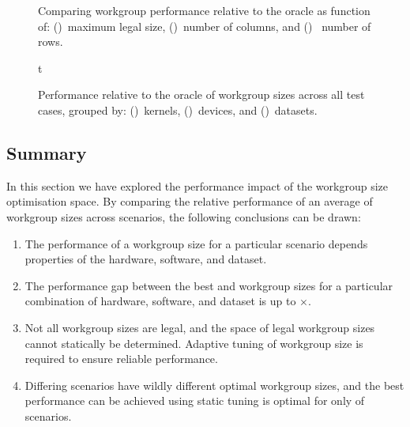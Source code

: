 \begin{figure}

\caption{%
  Comparing workgroup performance relative to the oracle as function
  of: ()~maximum legal size,
  ()~number of columns, and
  ()~ number of rows.%
}
\label{fig:performance-wgsizes}
\end{figure}
\newpage
\begin{figure}t

\caption{%
  Performance relative to the oracle of workgroup sizes across all
  test cases, grouped by: ()~kernels,
  ()~devices, and
  ()~datasets.%
}
\label{fig:performances}
\end{figure}


\subsection{Summary}

In this section we have explored the performance impact of the
workgroup size optimisation space. By comparing the relative
performance of an average of  workgroup
sizes across  scenarios, the following
conclusions can be drawn:

\begin{enumerate}
\item The performance of a workgroup size for a particular scenario
  depends properties of the hardware, software, and dataset.
\item The performance gap between the best and workgroup sizes for a
  particular combination of hardware, software, and dataset is up to
  $\times$.
\item Not all workgroup sizes are legal, and the space of legal
  workgroup sizes cannot statically be determined. Adaptive tuning of
  workgroup size is required to ensure reliable performance.
\item Differing scenarios have wildly different optimal workgroup
  sizes, and the best performance can be achieved using static tuning
  is optimal for only  of
  scenarios.
\end{enumerate}


